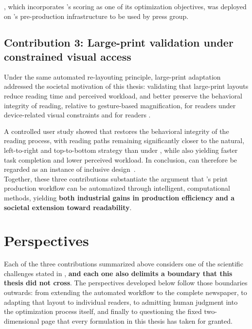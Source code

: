 \begin{graybox}
\methodNameGeneral, which incorporates \neuralmethod's scoring as one of its optimization objectives, was deployed on \melody's pre-production infrastructure to be used by \laprovence press group.
\end{graybox}

\subsection*{Contribution 3: Large-print validation under constrained visual access}

Under the same automated re-layouting principle, large-print adaptation addressed the societal motivation of this thesis: validating that large-print layouts reduce reading time and perceived workload, and better preserve the behavioral integrity of reading, relative to gesture-based magnification, for readers \NV under device-related visual constraints and for readers \LV.

A controlled user study showed that \condtwonot restores the behavioral integrity of the reading process, with reading paths remaining significantly closer to the natural, left-to-right and top-to-bottom strategy than under \condonenot, while also yielding faster task completion and lower perceived workload. In conclusion, \condtwonot can therefore be regarded as an instance of inclusive design~\cite{langdon-inclusive-design-2014}. \ \\

Together, these three contributions substantiate the argument that \melody's print production workflow can be automatized through intelligent, computational methods, yielding \textbf{both industrial gains in production efficiency and a societal extension toward readability}.


\section{Perspectives}
\label{sec:perspectives}

Each of the three contributions summarized above considers one of the scientific challenges stated in , \textbf{and each one also delimits a boundary that this thesis did not cross}. The perspectives developed below follow those boundaries outwards: from extending the automated workflow to the complete newspaper, to adapting that layout to individual readers, to admitting human judgment into the optimization process itself, and finally to questioning the fixed two-dimensional page that every formulation in this thesis has taken for granted.

